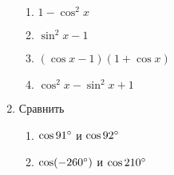 \documentclass[12pt, a4paper]{article}
\begin{document}
\begin{enumerate}
\begin{multicols}{2}
\begin{enumerate}[label=\asbuk*)]
				\item $1-\cos^2x$
				\item $\sin^2x-1$
				\item $(\cos x - 1)(1 + \cos x)$
				\item $\cos^2 x - \sin^2 x + 1$
			\end{enumerate}
		\end{multicols}
		\item Сравнить
		\begin{multicols}{2}
			\begin{enumerate}[label=\asbuk*)]
				\item $\cos 91\degree$ и $\cos 92\degree$
				\item $\cos (-260\degree)$ и $\cos 210\degree$
			\end{enumerate}
		\end{multicols} 
	\end{enumerate}
	
\end{document}
